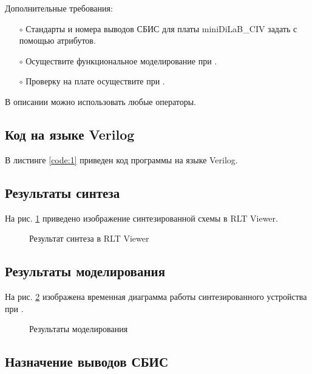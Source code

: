 Дополнительные требования:
\begin{itemize}
	\item[$\circ$] Стандарты и номера выводов СБИС для платы miniDiLaB\_CIV задать с помощью атрибутов.
	\item[$\circ$] Осуществите функциональное моделирование при .
	\item[$\circ$] Проверку на плате осуществите при .
\end{itemize}
В описании можно использовать любые операторы.

\subsection{Код на языке Verilog}

В листинге \ref{code:1} приведен код программы на языке Verilog.

%

\subsection{Результаты синтеза}

На рис. \ref{fig:lab7_1_rtl} приведено изображение синтезированной схемы в RLT Viewer.

\begin{figure}[H]
\begin{center}
	\caption{Результат синтеза в RLT Viewer}
	\label{fig:lab7_1_rtl}
\end{center}
\end{figure}

\subsection{Результаты моделирования}
\label{sec:lab7_1_modeling}

На рис. \ref{fig:lab7_1_modeling} изображена временная диаграмма работы синтезированного устройства  при .

\begin{figure}[H]
\begin{center}
	\caption{Результаты моделирования}
	\label{fig:lab7_1_modeling}
\end{center}
\end{figure}

\subsection{Назначение выводов СБИС}

